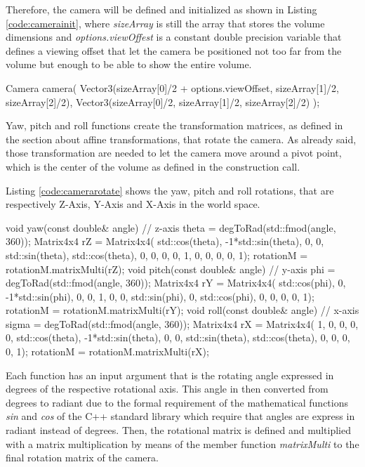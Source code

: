 \documentclass[12pt,a4paper]{extarticle}
\newcommand{\linespace}{\vspace{8pt}}
\begin{document}
Therefore, the camera will be defined and initialized as shown in Listing \ref{code:camerainit}, where \textit{sizeArray} is still the array that stores the volume dimensions and \textit{options.viewOffest} is a constant double precision variable that defines a viewing offset that let the camera be positioned not too far from the volume but enough to be able to show the entire volume.

\begin{cpp}[caption={Camera definition and initialization.},label=code:camerainit]
Camera camera(
	Vector3(sizeArray[0]/2 + options.viewOffset, 
		sizeArray[1]/2, sizeArray[2]/2), 
	Vector3(sizeArray[0]/2, sizeArray[1]/2, sizeArray[2]/2)
	);
\end{cpp} 

Yaw, pitch and roll functions create the transformation matrices, as defined in the section about affine transformations, that rotate the camera. As already said, those transformation are needed to let the camera move around a pivot point, which is the center of the volume as defined in the construction call.

Listing \ref{code:camerarotate} shows the yaw, pitch and roll rotations, that are respectively Z-Axis, Y-Axis and X-Axis in the world space.

\begin{cpp}[caption={},label=code:camerarotate]
void yaw(const double& angle) { // z-axis
	theta = degToRad(std::fmod(angle, 360));
	Matrix4x4 rZ = Matrix4x4(
		std::cos(theta), -1*std::sin(theta), 0, 0,
		std::sin(theta), std::cos(theta), 0, 0,
		0, 0, 1, 0,
		0, 0, 0, 1);
	rotationM = rotationM.matrixMulti(rZ);
}
void pitch(const double& angle) { // y-axis
	phi = degToRad(std::fmod(angle, 360));
	Matrix4x4 rY = Matrix4x4(
		std::cos(phi), 0, -1*std::sin(phi), 0,
		0, 1, 0, 0,
		std::sin(phi), 0, std::cos(phi), 0,
		0, 0, 0, 1);
	rotationM = rotationM.matrixMulti(rY);
}
void roll(const double& angle) { // x-axis
	sigma = degToRad(std::fmod(angle, 360));
	Matrix4x4 rX = Matrix4x4(
		1, 0, 0, 0,
		0, std::cos(theta), -1*std::sin(theta), 0,
		0, std::sin(theta), std::cos(theta), 0,
		0, 0, 0, 1);
	rotationM = rotationM.matrixMulti(rX);
}
\end{cpp}

Each function has an input argument that is the rotating angle expressed in degrees of the respective rotational axis. This angle in then converted from degrees to radiant due to the formal requirement of the mathematical functions \textit{sin} and \textit{cos} of the C++ standard library which require that angles are express in radiant instead of degrees.
Then, the rotational matrix is defined and multiplied with a matrix multiplication by means of the member function \textit{matrixMulti} to the final rotation matrix of the camera.
\linespace
\end{document}
